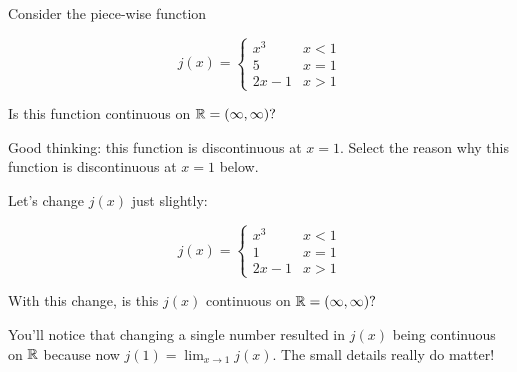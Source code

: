 \documentclass[handout]{ximera}
\begin{document}
\begin{exercise}
Consider the piece-wise function 

\[
j(x) = \begin{cases}
  x^3  & x < 1 \\
  5 & x=1 \\
  2x-1 & x > 1
\end{cases}
\]

Is this function continuous on $\mathbb R = (\infty, \infty)?$  

\begin{multipleChoice}
\end{multipleChoice}

\begin{exercise}

Good thinking: this function is discontinuous at $x=1$.  Select the reason why this function is discontinuous at $x=1$ below.

\begin{multipleChoice}
\end{multipleChoice}

\begin{exercise}

Let's change $j(x)$ just slightly: 

\[
j(x) = \begin{cases}
  x^3  & x < 1 \\
  1 & x=1 \\ 
  2x-1 & x > 1
\end{cases}
\]

With this change, is this $j(x)$ continuous on $\mathbb R = (\infty, \infty)?$  

\begin{multipleChoice}
    
\begin{feedback}[correct]
You'll notice that changing a single number resulted in $j(x)$ being continuous on $\mathbb R$ because now $j(1) = \displaystyle\lim_{x \to 1} j(x)$.  The small details really do matter!   
\end{feedback}
\end{multipleChoice}

\end{exercise}
\end{exercise}
\end{exercise}
\end{document}
